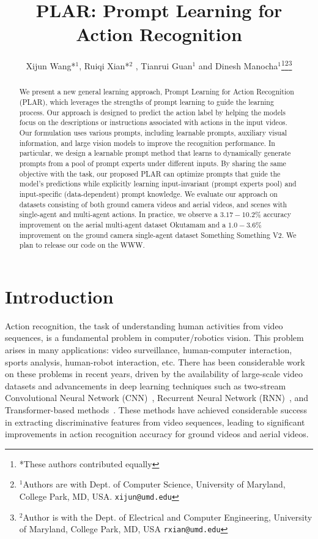 \documentclass[letterpaper, 10 pt, conference]{ieeeconf}
\title{PLAR: Prompt Learning for Action Recognition}
\author{Xijun Wang*$^{1}$, Ruiqi Xian*$^{2}$ , Tianrui Guan$^{1}$ and Dinesh Manocha$^{1}$\thanks{*These authors contributed equally}\thanks{$^{1}$Authors are with Dept. of Computer Science, University of Maryland, College Park, MD, USA.
        {\tt\small xijun@umd.edu}}\thanks{$^{2}$Author is with the Dept. of Electrical and Computer Engineering, University of Maryland, College Park, MD, USA
        {\tt\small rxian@umd.edu}}}
\begin{document}
\maketitle
\thispagestyle{empty}
\pagestyle{empty}
\begin{abstract}




We present a new general learning approach, Prompt Learning for Action Recognition (PLAR), which leverages the strengths of prompt learning to guide the learning process. Our approach is designed to predict the action label by helping the models focus on the descriptions or instructions associated with actions in the input videos. Our formulation uses various prompts, including learnable prompts, auxiliary visual information, and large vision models to improve the recognition performance. In particular, we design a learnable prompt method that learns to dynamically generate prompts from a pool of prompt experts under different inputs. By sharing the same objective with the task, our proposed PLAR can optimize prompts that guide the model's predictions while explicitly learning input-invariant (prompt experts pool) and input-specific (data-dependent) prompt knowledge. We evaluate our approach on datasets consisting of both ground camera videos and aerial videos, and scenes with single-agent and multi-agent actions. In practice, we observe a $3.17-10.2\%$ accuracy improvement on the aerial multi-agent dataset Okutamam and a $1.0-3.6\%$ improvement on the ground camera single-agent dataset Something Something V2. We plan to release our code on the WWW. 

\end{abstract}


%
 \section{Introduction}

Action recognition, the task of understanding human activities from video sequences, is a fundamental problem in computer/robotics vision. This problem arises in many applications: video surveillance, human-computer interaction,  sports analysis, human-robot interaction, etc. There has been considerable work on these problems in recent years, driven by the availability of large-scale video datasets and advancements in deep learning techniques such as two-stream Convolutional Neural Network (CNN)~\cite{simonyan2014two}, Recurrent Neural Network (RNN)~\cite{sun2017lattice}, and Transformer-based methods~\cite{vaswani2017attention,li2022mvitv2}. These methods have achieved considerable success in extracting discriminative features from video sequences, leading to significant improvements in action recognition accuracy for ground videos and aerial videos.
\end{document}
